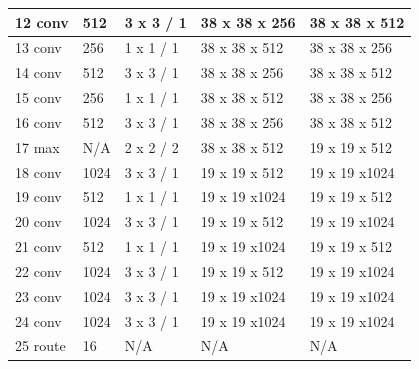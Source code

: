 \begin{center}
\begin{table}[h]
\begin{tabular}{| l | l | l | l | l |}
    \rowcolor{LightCyan}
   12 conv &    512  & 3 x 3 / 1   &  38 x  38 x 256   &    38 x  38 x 512 \\ \hline

    \rowcolor{LightCyan}
   13 conv &    256  & 1 x 1 / 1   &  38 x  38 x 512   &    38 x  38 x 256 \\ \hline

    \rowcolor{LightCyan}
   14 conv &    512  & 3 x 3 / 1   &  38 x  38 x 256   &    38 x  38 x 512 \\ \hline

    \rowcolor{LightCyan}
   15 conv &    256  & 1 x 1 / 1   &  38 x  38 x 512   &    38 x  38 x 256 \\ \hline

    \rowcolor{LightCyan}
   16 conv &    512  & 3 x 3 / 1   &  38 x  38 x 256   &    38 x  38 x 512 \\ \hline

   \rowcolor{Salmon}
   17 max &     N/A     & 2 x 2 / 2   &  38 x  38 x 512   &    19 x  19 x 512 \\ \hline \hline

    \rowcolor{LightCyan}
   18 conv &   1024  & 3 x 3 / 1   &  19 x  19 x 512   &    19 x  19 x1024 \\ \hline

    \rowcolor{LightCyan}
   19 conv &    512  & 1 x 1 / 1   &  19 x  19 x1024   &    19 x  19 x 512 \\ \hline

    \rowcolor{LightCyan}
   20 conv &   1024  & 3 x 3 / 1   &  19 x  19 x 512   &    19 x  19 x1024 \\ \hline

    \rowcolor{LightCyan}
   21 conv &    512  & 1 x 1 / 1   &  19 x  19 x1024   &    19 x  19 x 512 \\ \hline

    \rowcolor{LightCyan}
   22 conv &   1024  & 3 x 3 / 1   &  19 x  19 x 512   &    19 x  19 x1024 \\ \hline

    \rowcolor{LightCyan}
   23 conv &   1024  & 3 x 3 / 1   &  19 x  19 x1024   &    19 x  19 x1024 \\ \hline

    \rowcolor{LightCyan}
   24 conv &   1024  & 3 x 3 / 1   &  19 x  19 x1024   &    19 x  19 x1024 \\ \hline \hline

   \rowcolor{LightGreen}
   25 route  & 16 & N/A & N/A & N/A \\ \hline


\end{tabular}
\end{table}
\end{center}
